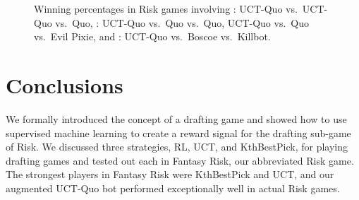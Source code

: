 \documentclass[letterpaper]{article}
\numberwithin{equation}{section}
\numberwithin{theorem}{section}
\numberwithin{lemma}{section}
\numberwithin{df}{section}
\begin{document}
\begin{figure}[t]
{\label{fig:UCTvsQUOvsEP}
}\hspace{5pt}
\caption[]{Winning percentages in Risk games involving : UCT-Quo vs.~UCT-Quo vs.~Quo, : UCT-Quo vs.~Quo vs.~Quo,   UCT-Quo vs.~Quo vs.~Evil Pixie, and : UCT-Quo vs.~Boscoe vs.~Killbot.}
\label{fig:ActualRisk}
\end{figure}


\section{Conclusions}


We formally introduced the concept of a drafting game and showed how to use supervised machine learning to create a reward signal for the drafting sub-game of Risk.  We discussed three strategies, RL, UCT, and KthBestPick, for playing drafting games and tested out each in Fantasy Risk, our abbreviated Risk game.  The strongest players in Fantasy Risk were KthBestPick and UCT, and our augmented UCT-Quo bot performed exceptionally well in actual Risk games.

\end{document}
